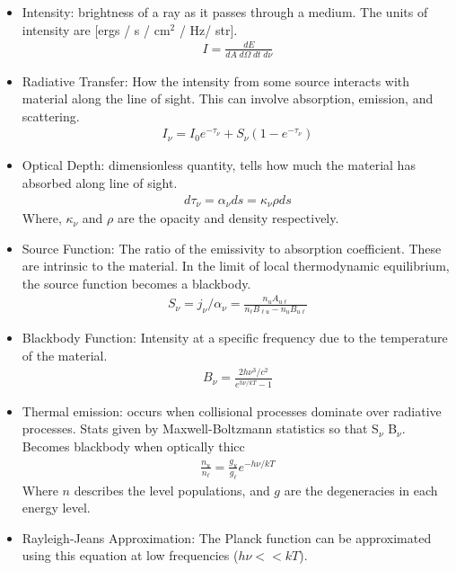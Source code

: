 \begin{itemize}
    \item{Intensity: brightness of a ray as it passes through a medium. The units of intensity are [ergs / s / cm$^{2}$ / Hz/ str].
    \begin{align}
    I = \frac{dE}{dA\;d\Omega\;dt\;d\nu}
    \end{align}
    }
    \item{Radiative Transfer: How the intensity from some source interacts with material along the line of sight. This can involve absorption, emission, and scattering.
    \begin{align}
    I_{\nu} = I_{0} e^{-\tau_{\nu}} + S_{\nu} (1 - e^{-\tau_{\nu}})
    \end{align}
    }
    \item{Optical Depth: dimensionless quantity, tells how much the material has absorbed along line of sight.
    \begin{align}
        d\tau_{\nu} = \alpha_{\nu} ds = \kappa_{\nu} \rho ds
    \end{align}
    Where, $\kappa_{\nu}$ and $\rho$ are the opacity and density respectively.
    }
    \item{Source Function: The ratio of the emissivity to absorption coefficient. These are intrinsic to the material. In the limit of local thermodynamic equilibrium, the source function becomes a blackbody.
    \begin{align}
    S_{\nu} = j_{\nu} / \alpha_{\nu} = \frac{n_{u} A_{u \ell}}{n_{\ell} B_{\ell u} - n_{u} B_{u \ell}}
    \end{align}
    }
    \item{Blackbody Function: Intensity at a specific frequency due to the temperature of the material.
    \begin{align}
        B_{\nu} = \frac{2h\nu^{3} / c^{2}}{e^{h\nu/kT} - 1}
    \end{align}
    }
    \item{Thermal emission: occurs when collisional processes dominate over radiative processes. Stats given by Maxwell-Boltzmann statistics so that S$_\nu$ \rightangle B$_\nu$. Becomes blackbody when optically thicc
    \begin{align}
        \frac{n_{u}}{n_{\ell}} = \frac{g_u}{g_\ell}e^{-h\nu/kT}
    \end{align}
    Where $n$ describes the level populations, and $g$ are the degeneracies in each energy level.
    }
    \item{Rayleigh-Jeans Approximation: The Planck function can be approximated using this equation at low frequencies ($h\nu<<kT$).
}
\end{itemize}
